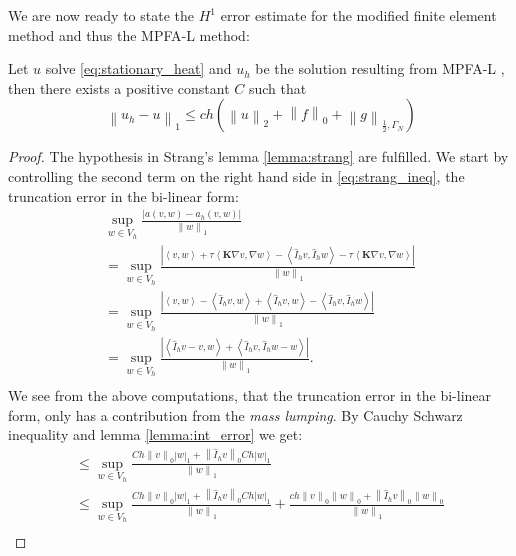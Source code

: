 \documentclass[../Main/main.tex]{subfiles}
\begin{document}
	We are now ready to state the $H^1$ error estimate for the modified finite element method and thus the MPFA-L method:
	\begin{theorem}
		Let $u$ solve \eqref{eq:stationary_heat} and $u_h$ be the solution resulting from MPFA-L , then there exists a positive constant $C$ such that
		\begin{equation}\
			\left \|u_h - u \right \|_1 \leq c h (\left \| u \right \|_2 + \left \| f \right \|_0 + \left \| g \right \|_{\frac{1}{2},\Gamma_N})
		\end{equation}
	\end{theorem}
	\begin{proof}
		The hypothesis in Strang's lemma \ref{lemma:strang} are fulfilled.
		We start by controlling the second term on the right hand side in \eqref{eq:strang_ineq}, the truncation error in the bi-linear form:
		\begin{equation}
			\begin{gathered}
				\sup_{w\in V_h} \frac{|a(v,w)-a_h(v,w)|}{\left \|w \right \|_1} \\
				=\sup_{w\in V_h} \frac{|\left \langle v,w\right \rangle + \tau \left \langle \pmb{K} \nabla v,\nabla w \right \rangle - \left \langle \hat{I}_h v, \hat{I}_h w \right \rangle - \tau \left \langle \pmb{K} \nabla v, \nabla w \right \rangle|}{\left \| w \right \|_1} \\
				=\sup_{w\in V_h} \frac{|\left \langle v,w\right \rangle - \left \langle \hat{I}_h v, w \right \rangle + \left \langle \hat{I}_h v, w \right \rangle - \left \langle \hat{I}_h v, \hat{I}_h w \right \rangle|}{\left \| w \right \|_1}\\
				= \sup_{w\in V_h}\frac{|\left \langle \hat{I}_h v - v,w \right \rangle + \left \langle \hat{I}_h v, \hat{I}_h w - w \right \rangle |}{\left \| w \right \|_1}. \\
			\end{gathered}
		\end{equation}
		We see from the above computations, that the truncation error in the bi-linear form, only has a contribution from the \emph{mass lumping}.
		By Cauchy Schwarz inequality and lemma \ref{lemma:int_error} we get:
		\begin{equation}
			\begin{gathered}
				\leq \sup_{w\in V_h}\frac{Ch\left \| v \right \|_0 | w|_1 + \left \|\hat{I}_h v\right \|_0 Ch|w|_1}{\left \| w \right \|_1}\\
				\leq 				 \sup_{w\in V_h}\frac{Ch\left \| v \right \|_0 | w|_1 + \left \|\hat{I}_h v\right \|_0 Ch|w|_1}{\left \| w \right \|_1} + \frac{ch\left \| v \right \|_0 \left \| w \right \|_0 + \left \|\hat{I}_h v\right \|_0 \left \| w \right \|_0}{\left \| w \right \|_1}\\

\end{gathered}
\end{equation}
\end{proof}
\end{document}
